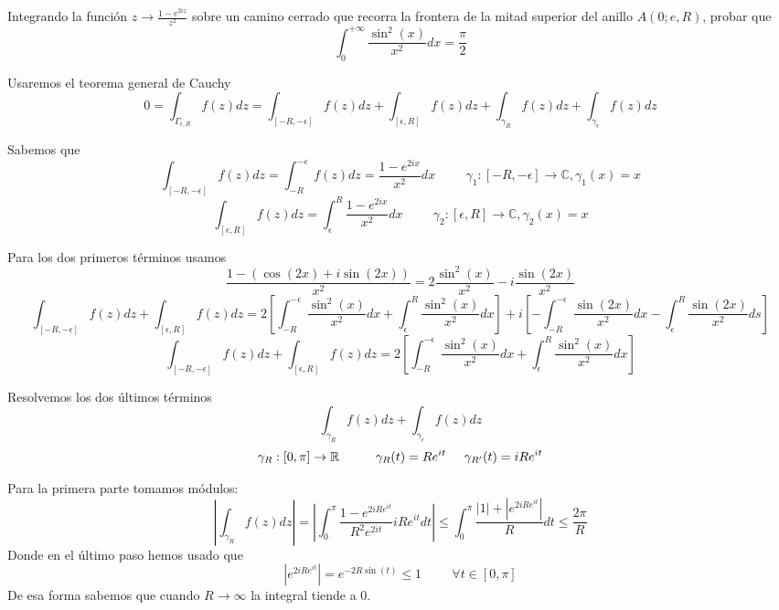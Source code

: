 \begin{ejer}
	Integrando la función $z\rightarrow\frac{1-e^{2iz}}{z^2}$ sobre un camino cerrado que recorra la frontera de la mitad superior del anillo $A(0;e,R)$, probar que
	$$ \int_{0}^{+\infty} \frac{\sin^2(x)}{x^2}dx = \frac{\pi}{2} $$
\end{ejer}
\begin{sol}

Usaremos el teorema general de Cauchy
\begin{equation}
	0 = \int_{\Gamma_{\epsilon,R}} f(z)dz = \int_{[-R,-\epsilon]}f(z)dz + \int_{[\epsilon,R]} f(z)dz + \int_{\gamma_R} f(z)dz + \int_{\gamma_{\epsilon}} f(z)dz
	\label{ej9-integrales}
\end{equation}

Sabemos que
$$\int_{[-R,-\epsilon]}f(z)dz = \int_{-R}^{-\epsilon}f(z)dz =  \frac{1-e^{2ix}}{x^2}dx
\hspace{1cm}\gamma_1 : [-R,-\epsilon] \rightarrow\mathbb{C}, \gamma_1(x)=x$$
$$\int_{[\epsilon,R]} f(z)dz = \int_{\epsilon}^{R} \frac{1-e^{2ix}}{x^2}dx
\hspace{1cm}\gamma_2:[\epsilon,R]\rightarrow\mathbb{C}, \gamma_2(x)=x$$

Para los dos primeros términos usamos
$$\frac{1-(\cos(2x)+i\sin(2x))}{x^2} = 2\frac{\sin^2(x)}{x^2}-i\frac{\sin(2x)}{x^2}$$
$$\int_{[-R,-\epsilon]} f(z)dz + \int_{[\epsilon,R]} f(z)dz = 2\left[ \int_{-R}^{-\epsilon} \frac{\sin^2(x)}{x^2}dx + \int_{\epsilon}^{R} \frac{\sin^2(x)}{x^2}dx \right] + i\left[ -\int_{-R}^{-\epsilon}\frac{\sin(2x)}{x^2}dx - \int_{\epsilon}^{R}\frac{\sin(2x)}{x^2}ds \right]$$
$$ \int_{[-R,-\epsilon]} f(z)dz + \int_{[\epsilon,R]} f(z)dz = 2\left[ \int_{-R}^{-\epsilon} \frac{\sin^2(x)}{x^2}dx + \int_{\epsilon}^{R} \frac{\sin^2(x)}{x^2}dx \right]$$

Resolvemos los dos últimos términos
$$ \int_{\gamma_R} f(z)dz + \int_{\gamma_{\epsilon}} f(z)dz $$
$$ \gamma_R : [0,\pi] \rightarrow\mathbb{R}\hspace{1cm} \gamma_R (t)=Re^{it}\hspace{0.5cm}\gamma_{R'}(t) = iRe^{it} $$

Para la primera parte tomamos módulos:
$$ \left| \int_{\gamma_R} f(z)dz \right| = \left| \int_0^{\pi} \frac{1-e^{2iRe^{it}}}{R^2e^{2it}} iRe^{it} dt \right| \leq \int_{0}^{\pi} \frac{|1|+|e^{2iRe^{it}}|}{R}dt \leq \frac{2\pi}{R} $$
Donde en el último paso hemos usado que
$$ |e^{2iRe^{it}}| = e^{-2R\sin(t)} \leq 1 \hspace{1cm} \forall t\in[0,\pi] $$
De esa forma sabemos que cuando $R\rightarrow\infty$ la integral tiende a $0$.


\end{sol}
